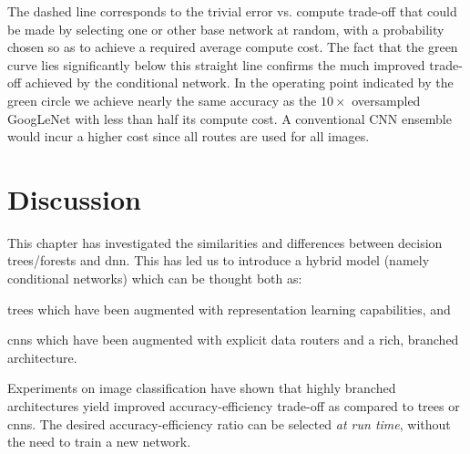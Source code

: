 \documentclass[thesis]{subfiles}
\begin{document}
	The dashed line corresponds to the trivial error vs. compute trade-off that could be made by selecting one or other base network at random, with a probability chosen so as to achieve a required average compute cost. The fact that the green curve lies significantly below this straight line confirms the much improved trade-off achieved by the conditional network. 
	In the operating point indicated by the green circle we achieve nearly the same accuracy as the $10\times$ oversampled GoogLeNet with less than half its compute cost.
	A conventional CNN ensemble would incur a higher cost since all routes are used for all images.

	\section{Discussion}
	This chapter has investigated the similarities and differences between decision trees/forests and \gls{dnn}. This has led us to introduce a hybrid model (namely conditional networks) which can be thought both as: 
	\begin{enumerate*}[label= (\textbf{\roman*})]
	\item trees which have been augmented with representation learning capabilities, and
	\item \glspl{cnn} which have been augmented with explicit data routers and a rich, branched architecture.
	\end{enumerate*}
	Experiments on image classification have shown that highly branched architectures yield improved accuracy-efficiency trade-off as compared to trees or \glspl{cnn}. The desired accuracy-efficiency ratio can be selected \emph{at run time}, without the need to train a new network.
	
\end{document}
